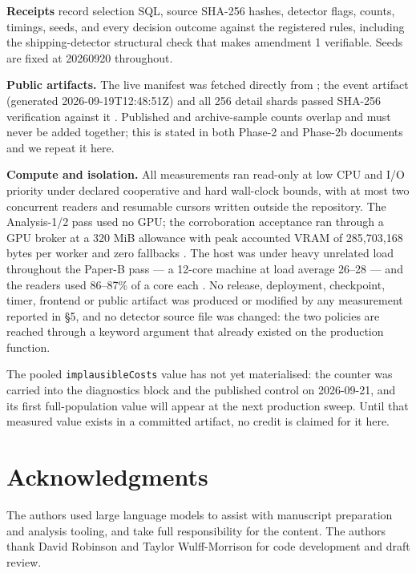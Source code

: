 \documentclass[11pt]{article}
\begin{document}
\textbf{Receipts} record selection SQL, source SHA-256 hashes, detector flags, counts, timings, seeds, and every decision outcome against the registered rules, including the shipping-detector structural check that makes amendment 1 verifiable. Seeds are fixed at 20260920 throughout.

\textbf{Public artifacts.} The live manifest was fetched directly from ; the event artifact  (generated 2026-09-19T12:48:51Z) and all 256 detail shards passed SHA-256 verification against it%
. Published and archive-sample counts overlap and must never be added together; this is stated in both Phase-2 and Phase-2b documents and we repeat it here.

\textbf{Compute and isolation.} All measurements ran read-only at low CPU and I/O priority under declared cooperative and hard wall-clock bounds, with at most two concurrent readers and resumable cursors written outside the repository. The Analysis-1/2 pass used no GPU; the corroboration acceptance ran through a GPU broker at a 320 MiB allowance with peak accounted VRAM of 285,703,168 bytes per worker and zero fallbacks%
. The host was under heavy unrelated load throughout the Paper-B pass --- a 12-core machine at load average 26--28 --- and the readers used 86--87\% of a core each%
. No release, deployment, checkpoint, timer, frontend or public artifact was produced or modified by any measurement reported in \S{}5, and no detector source file was changed: the two policies are reached through a keyword argument that already existed on the production function.

The pooled \texttt{implausibleCosts} value has not yet materialised: the counter was carried into the diagnostics block and the published control on 2026-09-21, and its first full-population value will appear at the next production sweep. Until that measured value exists in a committed artifact, no credit is claimed for it here.

\section*{Acknowledgments}

The authors used large language models to assist with manuscript preparation and analysis tooling, and take full responsibility for the content. The authors thank David Robinson and Taylor Wulff-Morrison for code development and draft review.
\end{document}
